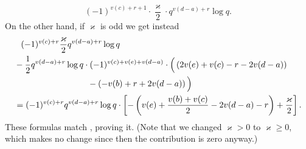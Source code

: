 \[ (-1)^{v(c)+r+1} \cdot \frac{\varkappa}{2} \cdot q^{v(d-a)+r} \log q. \]
On the other hand, if $\varkappa$ is odd we get instead
\begin{align*}
  &\phantom+ (-1)^{v(c)+r} \frac{\varkappa}{2} q^{v(d-a)+r} \log q \\
  &- \half q^{v(d-a)+r} \log q \cdot (-1)^{v(c)+v(e)+v(d-a)} \cdot
    \Big( \left( 2v(e)+v(c)-r-2v(d-a)\right) \\
    &\hspace{20ex} - \left( -v(b)+r+2v(d-a) \right) \Big) \\
  &= (-1)^{v(c)+r} q^{v(d-a)+r} \log q \cdot \left[
    -\left( v(e)+\frac{v(b)+v(c)}{2}-2v(d-a)-r \right) + \frac{\varkappa}{2} \right].
\end{align*}
These formulas match , proving it.
(Note that we changed $\varkappa > 0$ to $\varkappa \ge 0$,
which makes no change since then the contribution is zero anyway.)

